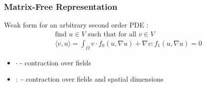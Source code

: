 \documentclass{beamer}
\begin{document}
\begin{frame}
\begin{center}
\frametitle{Matrix-Free Representation}

Weak form for an arbitrary second order PDE \cite{brown2010efficient}:\\

\begin{equation}
\begin{array}{c}
\text{find } u \in V \text{ such that for all } v \in V\\
\langle v, u \rangle = \int_{\Omega} v \cdot f_0 \left( u, \nabla u \right) + \nabla v : f_1 \left( u, \nabla u \right) = 0
\end{array}
\label{eq:weak_form}
\end{equation}

\begin{itemize}

\item $\cdot$ - contraction over fields\\

\item $:$ - contraction over fields and spatial dimensions\\

\end{itemize}

\end{center}
\end{frame}

\end{document}
